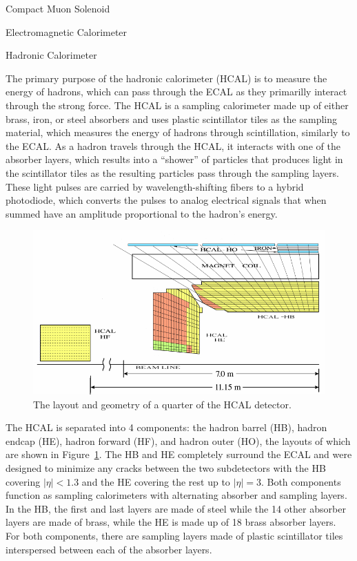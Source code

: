 \begin{section}{Compact Muon Solenoid}
\begin{subsection}{Electromagnetic Calorimeter}
\end{subsection}

\begin{subsection}{Hadronic Calorimeter}
\label{subsec:hcal}

The primary purpose of the hadronic calorimeter (HCAL) is to measure the energy of hadrons, which can pass through the ECAL as they primarilly interact through the strong force.
The HCAL is a sampling calorimeter made up of either brass, iron, or steel absorbers and uses plastic scintillator tiles as the sampling material, which measures the energy of hadrons through scintillation, similarly to the ECAL.
As a hadron travels through the HCAL, it interacts with one of the absorber layers, which results into a ``shower'' of particles that produces light in the scintillator tiles as the resulting particles pass through the sampling layers.
These light pulses are carried by wavelength-shifting fibers to a hybrid photodiode, which converts the pulses to analog electrical signals that when summed have an amplitude proportional to the hadron's energy. 

\begin{figure}[tbp!]
\begin{center}
\includegraphics[angle=0,width=0.80\columnwidth]{fig/cms_hcal.png}
\end{center}
\caption{The layout and geometry of a quarter of the HCAL detector.~\cite{1748-0221-5-03-T03014}}
\label{fig:cms_hcal}
\end{figure}

The HCAL is separated into 4 components: the hadron barrel (HB), hadron endcap (HE), hadron forward (HF), and hadron outer (HO), the layouts of which are shown in Figure~\ref{fig:cms_hcal}.
The HB and HE completely surround the ECAL and were designed to minimize any cracks between the two subdetectors with the HB covering $|\eta| < 1.3$ and the HE covering the rest up to $|\eta| = 3$.
Both components function as sampling calorimeters with alternating absorber and sampling layers.
In the HB, the first and last layers are made of steel while the 14 other absorber layers are made of brass, while the HE is made up of 18 brass absorber layers.
For both components, there are sampling layers made of plastic scintillator tiles interspersed between each of the absorber layers.


\end{subsection}
\end{section}
